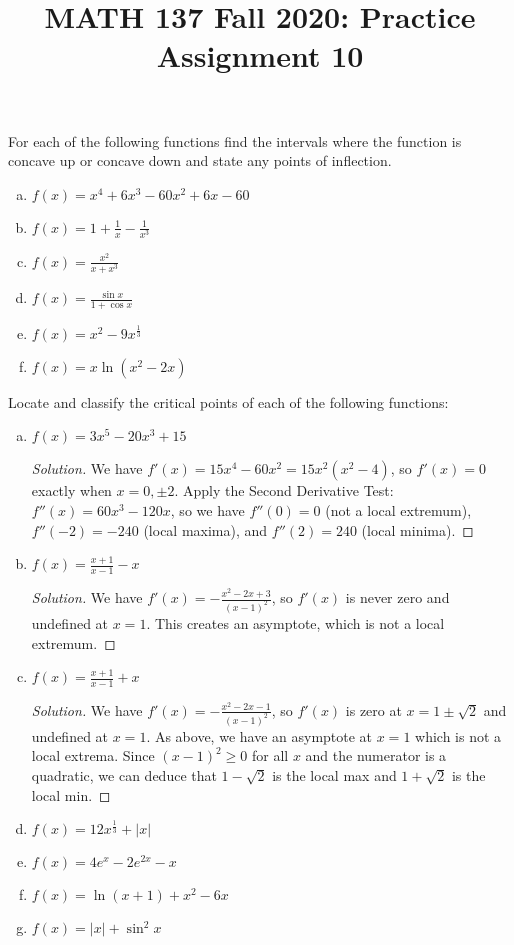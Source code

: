 
\title{MATH 137 Fall 2020: Practice Assignment 10}


\thispagestyle{firstpage}
\textbf{\@title}

\question For each of the following functions find the intervals where the function
is concave up or concave down and state any points of inflection.
\begin{enumerate}[(a)]
  \item $f(x) = x^4+6x^3-60x^2+6x-60$
  \item $f(x) = 1+\frac{1}{x}-\frac{1}{x^3}$
  \item $f(x) = \frac{x^2}{x+x^3}$
  \item $f(x) = \frac{\sin x}{1+\cos x}$
  \item $f(x) = x^2-9x^{\frac{1}{3}}$
  \item $f(x) = x\ln(x^2-2x)$
\end{enumerate}


\question Locate and classify the critical points of each of the following functions:
\begin{enumerate}[(a)]
  \item $f(x) = 3x^5-20x^3+15$
  \begin{proof}[Solution]
    We have $f'(x) = 15x^4-60x^2 = 15x^2(x^2-4)$, so $f'(x)=0$ exactly when $x=0,\pm2$.
    Apply the Second Derivative Test: $f''(x) = 60x^3-120x$, so we have
    $f''(0) = 0$ (not a local extremum), $f''(-2) = -240$ (local maxima), and $f''(2)=240$ (local minima).
  \end{proof}
  \item $f(x) = \frac{x+1}{x-1}-x$
  \begin{proof}[Solution]
    We have $f'(x) = -\frac{x^2-2x+3}{(x-1)^2}$, so $f'(x)$ is never zero and undefined at $x=1$.
    This creates an asymptote, which is not a local extremum.
  \end{proof}
  \item $f(x) = \frac{x+1}{x-1}+x$
  \begin{proof}[Solution]
    We have $f'(x) = -\frac{x^2-2x-1}{(x-1)^2}$, so $f'(x)$ is zero at $x=1\pm\sqrt2$ and undefined at $x=1$.
    As above, we have an asymptote at $x=1$ which is not a local extrema.
    Since $(x-1)^2 \geq 0$ for all $x$ and the numerator is a quadratic, we can deduce that
    $1-\sqrt2$ is the local max and $1+\sqrt2$ is the local min.
  \end{proof}
  \item $f(x) = 12x^{\frac{1}{3}}+|x|$
  \item $f(x) = 4e^x-2e^{2x}-x$
  \item $f(x) = \ln(x+1) + x^2 - 6x$
  \item $f(x) = |x|+\sin^2 x$
\end{enumerate}


